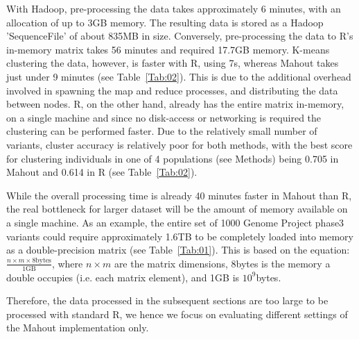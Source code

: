 \documentclass{bioinfo}
\begin{document}
With Hadoop, pre-processing the data takes approximately 6 minutes, with an allocation of up to 3GB memory. 
The resulting data is stored as a Hadoop 'SequenceFile' of about 835MB in size.
Conversely,  pre-processing the data to R's in-memory matrix takes 56 minutes and required 17.7GB memory. 
K-means clustering the data, however, is faster with R, using 7s, whereas Mahout takes just under 9 minutes (see Table~\ref{Tab:02}). 
This is due to the additional overhead involved in spawning the map and reduce processes, and distributing the data between nodes.
R, on the other hand, already has the entire matrix in-memory, on a single machine and since no disk-access or networking is required the clustering can be performed faster. 
Due to the relatively small number of variants, cluster accuracy is relatively poor for both methods, with the best \ARI{} score for clustering individuals in one of 4 populations (see Methods) being 0.705 in Mahout and 0.614 in R (see Table~\ref{Tab:02}).


While the overall processing time is already 40 minutes faster in Mahout than R, the real bottleneck for larger dataset will be the amount of memory available on a single machine. 
As an example, the entire set of 1000 Genome Project phase3 variants could require approximately 1.6TB to be completely loaded into memory as a double-precision matrix (see Table~\ref{Tab:01}). This is based on the equation:
$\frac{n \times m \times 8\text{bytes}}{1\text{GB}}$, where $n \times m$ are the matrix dimensions, 8bytes is the memory a double occupies (i.e. each matrix element), and  1GB is $10^9$bytes.

Therefore, the data processed in the subsequent sections are too large to be processed with standard R, we hence we focus on evaluating different settings of the Mahout implementation only.  
\end{document}
